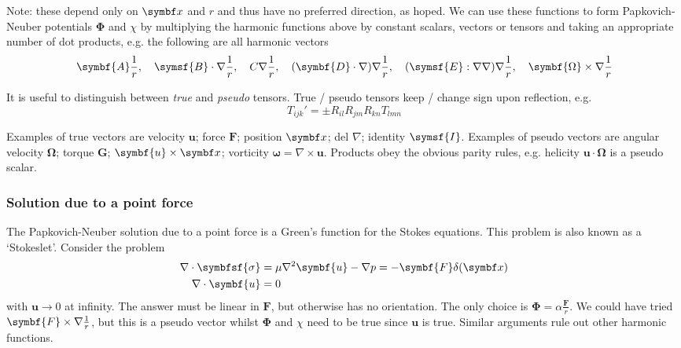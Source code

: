 \documentclass{jknotes}
\begin{document}
Note: these depend only on $\x$ and $r$ and thus have no preferred direction,
as hoped. We can use these functions to form Papkovich-Neuber potentials
$\symbf{\Phi}$ and $\chi$ by multiplying the harmonic functions above by constant
scalars, vectors or tensors and taking an appropriate number of dot products,
e.g. the following are all harmonic vectors
\begin{equation}
	\symbf{A} \inv{r}, \hspace{1em} \symsf{B} \cdot \nabla \inv{r},
	\hspace{1em} C \nabla \inv{r}, \hspace{1em} (\symbf{D} \cdot \nabla)\nabla
	\inv{r}, \hspace{1em} (\symsf{E}:\nabla\nabla)\nabla\inv{r}, \hspace{1em}
	\symbf{\Omega} \times \nabla \inv{r}
\end{equation}

It is useful to distinguish between \emph{true} and \emph{pseudo} tensors.
True / pseudo tensors keep / change sign upon reflection, e.g.
\begin{equation}
	T_{ijk}' = \pm R_{il} R_{jm} R_{kn} T_{lmn}
\end{equation}

Examples of true vectors are velocity $\symbf{u}$; force $\symbf{F}$; position $\x$;
 del $\nabla$; identity $\symsf{I}$.
Examples of pseudo vectors are angular velocity $\symbf{\Omega}$; torque
$\symbf{G}$; $\symbf{u} \times \x$; vorticity $\symbf{\omega} = \nabla \times \symbf{u}$.
Products obey the obvious parity rules, e.g. helicity $\symbf{u} \cdot
\symbf{\Omega}$ is a pseudo scalar.

\subsubsection{Solution due to a point force}
The Papkovich-Neuber solution due to a point force is a Green's function for
the Stokes equations. This problem is also known as a `Stokeslet'. Consider
the problem
\begin{equation}
	\begin{aligned}
		\nabla \cdot \symbfsf{\sigma} &= \mu \nabla^2 \symbf{u} - \nabla p = -
		\symbf{F} \delta(\x) \\
		\nabla \cdot \symbf{u} &= 0
	\end{aligned}
\end{equation}
with $\symbf{u} \to 0$ at infinity. The answer must be linear in $\symbf{F}$, but
otherwise has no orientation. The only choice is $\symbf{\Phi} = \alpha
\frac{\symbf{F}}{r}$. We could have tried $\symbf{F} \times \nabla \inv{r}$, but
this is a pseudo vector whilst $\symbf{\Phi}$ and $\chi$ need to be true since
$\symbf{u}$ is true. Similar arguments rule out other harmonic functions.
\end{document}
